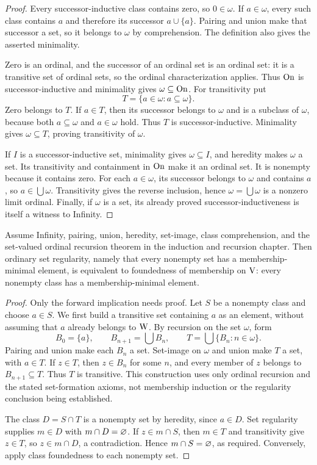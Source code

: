 \begin{proof}
Every successor-inductive class contains zero, so $0\in\omega$.
If $a\in\omega$, every such class contains $a$ and therefore its
successor $a\cup\{a\}$. Pairing and union make that successor a set,
so it belongs to $\omega$ by comprehension. The definition also gives
the asserted minimality.

Zero is an ordinal, and the successor of an ordinal set is an ordinal
set: it is a transitive set of ordinal sets, so the ordinal
characterization applies. Thus $\mathrm{On}$ is successor-inductive and
minimality gives $\omega\subseteq\mathrm{On}$. For transitivity put
\[
T=\{a\in\omega:a\subseteq\omega\}.
\]
Zero belongs to $T$. If $a\in T$, then its successor belongs to
$\omega$ and is a subclass of $\omega$, because both $a\subseteq\omega$
and $a\in\omega$ hold. Thus $T$ is successor-inductive. Minimality
gives $\omega\subseteq T$, proving transitivity of $\omega$.

If $I$ is a successor-inductive set, minimality gives $\omega\subseteq I$,
and heredity makes $\omega$ a set. Its transitivity and containment
in $\mathrm{On}$ make it an ordinal set. It is nonempty because it contains
zero. For each $a\in\omega$, its successor belongs to $\omega$ and
contains $a$, so $a\in\bigcup\omega$. Transitivity gives the reverse
inclusion, hence $\omega=\bigcup\omega$ is a nonzero limit ordinal.
Finally, if $\omega$ is a set, its already proved successor-inductiveness
is itself a witness to Infinity.
\end{proof}
\begin{proposition}
\label{thm:set_regularity_class_foundedness}
Assume Infinity, pairing, union, heredity, set-image, class comprehension,
and the set-valued ordinal recursion theorem in the induction and
recursion chapter. Then ordinary set
regularity, namely that every nonempty set has a membership-minimal
element, is equivalent to foundedness of membership on $\mathrm{V}$: every
nonempty class has a membership-minimal element.
\end{proposition}
\begin{proof}
Only the forward implication needs proof. Let $S$ be a nonempty class
and choose $a\in S$. We first build a transitive set containing $a$
as an element, without assuming that $a$ already belongs to $\mathrm{W}$.
By recursion on the set $\omega$, form
\[
B_0=\{a\},\qquad B_{n+1}=\bigcup B_n,\qquad
T=\bigcup\{B_n:n\in\omega\}.
\]
Pairing and union make each $B_n$ a set. Set-image on $\omega$ and
union make $T$ a set, with $a\in T$. If $z\in T$, then
$z\in B_n$ for some $n$, and every member of $z$ belongs to
$B_{n+1}\subseteq T$. Thus $T$ is transitive. This construction uses
only ordinal recursion and the stated set-formation axioms, not
membership induction or the regularity conclusion being established.

The class $D=S\cap T$ is a nonempty set by heredity, since $a\in D$.
Set regularity supplies $m\in D$ with $m\cap D=\varnothing$.
If $z\in m\cap S$, then $m\in T$ and transitivity give $z\in T$,
so $z\in m\cap D$, a contradiction. Hence $m\cap S=\varnothing$,
as required. Conversely, apply class foundedness to each nonempty set.
\end{proof}
